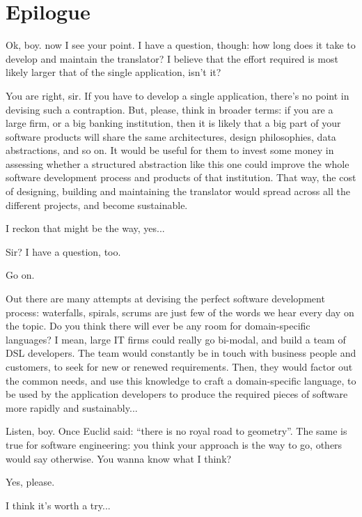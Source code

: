 \documentclass[12pt]{article} %
\newcommand{\dsl}{domain-specific language}
\newcommand{\q}[1]{``#1''}
\newenvironment{dialogue}{\list{---}{\itemsep=\parskip \topsep=\parskip \parsep=\parskip}}{\endlist}
\begin{document}
\section{Epilogue}
\begin{dialogue}
\item Ok, boy. now I see your point. I have a question, though: how long does it take to develop and maintain the translator? I believe that the effort required is most likely larger that of the single application, isn't it? 
\item You are right, sir. If you have to develop a single application, there's no point in devising such a contraption. But, please, think in broader terms: if you are a large firm, or a big banking institution, then it is likely that a big part of your software products will share the same architectures, design philosophies, data abstractions, and so on. It would be useful for them to invest some money in assessing whether a structured abstraction like this one could improve the whole software development process and products of that institution. That way, the cost of designing, building and maintaining the translator would spread across all the different projects, and become sustainable. 
\item I reckon that might be the way, yes...
\item Sir? I have a question, too.
\item Go on.
\item Out there are many attempts at devising the perfect software development process: waterfalls, spirals, scrums are just few of the words we hear every day on the topic. Do you think there will ever be any room for \dsl{}s? I mean, large IT firms could really go bi-modal, and build a team of DSL developers. The team would  constantly be in touch with business people and customers, to seek for new or renewed requirements. Then, they would factor out the common needs, and use this knowledge to craft a \dsl{}, to be used by the application developers to produce the required pieces of software more rapidly and sustainably... 
\item Listen, boy. Once Euclid said: \q{there is no royal road to geometry}. The same is true for software engineering: you think your approach is the way to go, others would say otherwise. You wanna know what I think? 
\item Yes, please.
\item I think it's worth a try...
\end{dialogue}
\newpage
\end{document}
